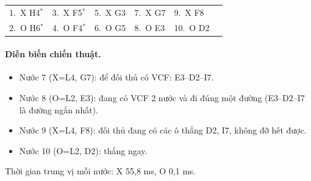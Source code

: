 {\footnotesize\linespread{1}\selectfont
\noindent\begin{tabularx}{\linewidth}{*{6}{X}}
\toprule
1.~X H4$^\ast$ & 3.~X F5$^\ast$ & 5.~X G3 & 7.~X G7 & 9.~X F8 &  \\
2.~O H6$^\ast$ & 4.~O F4$^\ast$ & 6.~O G5 & 8.~O E3 & 10.~O D2 &  \\
\bottomrule
\end{tabularx}\par}
\paragraph{Diễn biến chiến thuật.}
\begin{itemize}\footnotesize\linespread{1.1}\selectfont
\setlength{\itemsep}{0pt}
  \item Nước 7 (X=L4, G7): để đối thủ có VCF: E3--D2--I7.
  \item Nước 8 (O=L2, E3): đang có VCF 2 nước và đi đúng một đường (E3--D2--I7 là đường ngắn nhất).
  \item Nước 9 (X=L4, F8): đối thủ đang có các ô thắng D2, I7, không đỡ hết được.
  \item Nước 10 (O=L2, D2): thắng ngay.
\end{itemize}
Thời gian trung vị mỗi nước: X 55,8 ms, O 0,1 ms.
\clearpage

